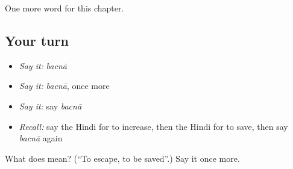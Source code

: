 \begin{grammarlens}[title={What you've built}]
One more word for this chapter.
\end{grammarlens}

\subsection*{Your turn}
\begin{itemize}
\raggedright
  \item \emph{Say it:} \emph{bacnā}
  \item \emph{Say it:} \emph{bacnā}, once more
  \item \emph{Say it:} say \emph{bacnā}
  \item \emph{Recall:} say the Hindi for to increase, then the Hindi for to save, then say \emph{bacnā} again
\end{itemize}

\begin{tcolorbox}[breakable,colback=teal!4,colframe=teal!35!black,title={Before you move on}]
What does  mean? (\textquotedblleft{}To escape, to be saved\textquotedblright{}.) Say it once more.
\end{tcolorbox}
